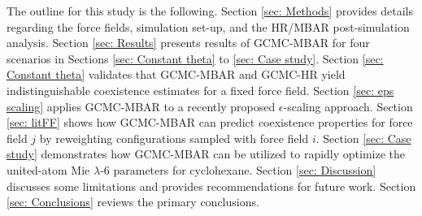 \documentclass[journal=jced,manuscript=article]{achemso}
\begin{document}
The outline for this study is the following. Section \ref{sec: Methods} provides details regarding the force fields, simulation set-up, and the HR/MBAR post-simulation analysis. Section \ref{sec: Results} presents results of GCMC-MBAR for four scenarios in Sections \ref{sec: Constant theta} to \ref{sec: Case study}. Section \ref{sec: Constant theta} validates that GCMC-MBAR and GCMC-HR yield indistinguishable coexistence estimates for a fixed force field. Section \ref{sec: eps scaling} applies GCMC-MBAR to a recently proposed $\epsilon$-scaling approach. Section \ref{sec: litFF} shows how GCMC-MBAR can predict coexistence properties for force field $j$ by reweighting configurations sampled with force field $i$. Section \ref{sec: Case study} demonstrates how GCMC-MBAR can be utilized to rapidly optimize the united-atom Mie $\lambda$-6 parameters for cyclohexane. Section \ref{sec: Discussion} discusses some limitations and provides recommendations for future work. Section \ref{sec: Conclusions} reviews the primary conclusions.


%
\end{document}
